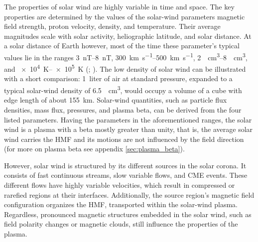 The properties of solar wind are highly variable in time and space. The key properties are determined by the values of the solar-wind parameters magnetic field strength, proton velocity, density, and temperature. Their average magnitudes scale with solar activity, heliographic latitude, and solar distance. At a solar distance of Earth however, most of the time these parameter's typical values lie in the ranges \SIrange{3}{8}{\nano\tesla}, \SIrange{300}{500}{\km\per\s}, \SIrange{2}{8}{\per\cm\cubed}, and \SIrange{e4}{e5}{\K} (\citealp[p.~92]{Kivelson1995}; \citealt{Venzmer2017}). The low density of solar wind can be illustrated with a short comparison: 1~liter of air at standard pressure, expanded to a typical solar-wind density of \SI{6.5}{\per\cm\cubed}, would occupy a volume of a cube with edge length of about \SI{155}{\km}.
Solar-wind quantities, such as particle flux densities, mass flux, pressures, and plasma beta, can be derived from the four listed parameters. Having the parameters in the aforementioned ranges, the solar wind is a plasma with a beta mostly greater than unity, that is, the average solar wind carries the HMF and its motions are not influenced by the field direction (for more on plasma beta see appendix \ref{sec:plasma_beta}).

However, solar wind is structured by its different sources in the solar corona. It consists of fast continuous streams, slow variable flows, and CME events. These different flows have highly variable velocities, which result in compressed or rarefied regions at their interfaces. Additionally, the source region's magnetic field configuration organizes the HMF, transported within the solar-wind plasma. Regardless, pronounced magnetic structures embedded in the solar wind, such as field polarity changes or magnetic clouds, still influence the properties of the plasma.

